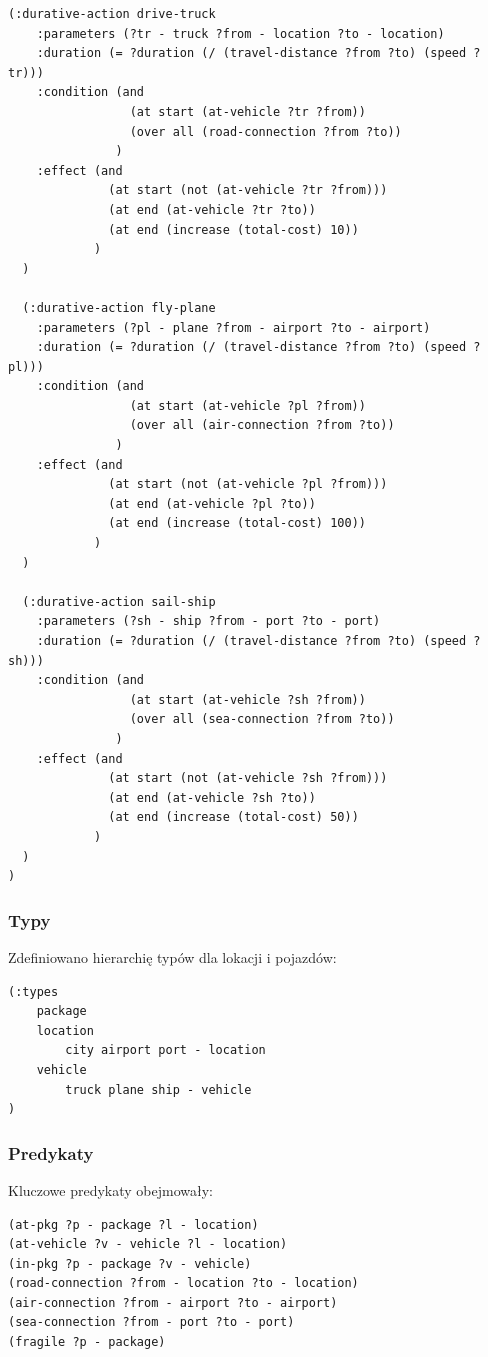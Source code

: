 \documentclass[11pt,a4paper]{article}
\begin{document}
\begin{lstlisting}[caption=Domena zadania 1, label=lst:req_task1]
  (:durative-action drive-truck
    :parameters (?tr - truck ?from - location ?to - location)
    :duration (= ?duration (/ (travel-distance ?from ?to) (speed ?tr)))
    :condition (and
                 (at start (at-vehicle ?tr ?from))
                 (over all (road-connection ?from ?to))
               )
    :effect (and
              (at start (not (at-vehicle ?tr ?from)))
              (at end (at-vehicle ?tr ?to))
              (at end (increase (total-cost) 10))
            )
  )

  (:durative-action fly-plane
    :parameters (?pl - plane ?from - airport ?to - airport)
    :duration (= ?duration (/ (travel-distance ?from ?to) (speed ?pl)))
    :condition (and
                 (at start (at-vehicle ?pl ?from))
                 (over all (air-connection ?from ?to))
               )
    :effect (and
              (at start (not (at-vehicle ?pl ?from)))
              (at end (at-vehicle ?pl ?to))
              (at end (increase (total-cost) 100))
            )
  )

  (:durative-action sail-ship
    :parameters (?sh - ship ?from - port ?to - port)
    :duration (= ?duration (/ (travel-distance ?from ?to) (speed ?sh)))
    :condition (and
                 (at start (at-vehicle ?sh ?from))
                 (over all (sea-connection ?from ?to))
               )
    :effect (and
              (at start (not (at-vehicle ?sh ?from)))
              (at end (at-vehicle ?sh ?to))
              (at end (increase (total-cost) 50))
            )
  )
)
\end{lstlisting}

\subsubsection{Typy}
Zdefiniowano hierarchię typów dla lokacji i pojazdów:
\begin{lstlisting}[caption=Typy w domenie Zadania 1, label=lst:types_task1]
(:types
    package
    location
        city airport port - location
    vehicle
        truck plane ship - vehicle
)
\end{lstlisting}

\subsubsection{Predykaty}
Kluczowe predykaty obejmowały:
\begin{lstlisting}[caption=Predykaty w domenie Zadania 1, label=lst:pred_task1]
(at-pkg ?p - package ?l - location)
(at-vehicle ?v - vehicle ?l - location)
(in-pkg ?p - package ?v - vehicle)
(road-connection ?from - location ?to - location)
(air-connection ?from - airport ?to - airport)
(sea-connection ?from - port ?to - port)
(fragile ?p - package)
\end{lstlisting}
\end{document}
